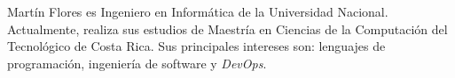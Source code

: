 \documentclass[10pt,journal,compsoc]{IEEEtran}
\begin{document}
\begin{IEEEbiography}{Martín Flores}
es Ingeniero en Informática de la Universidad Nacional. Actualmente, realiza sus estudios de Maestría en Ciencias de la Computación del Tecnológico de Costa Rica. Sus principales intereses son: lenguajes de programación, ingeniería de software y \emph{DevOps}.
\end{IEEEbiography}




\vfill




\end{document}
